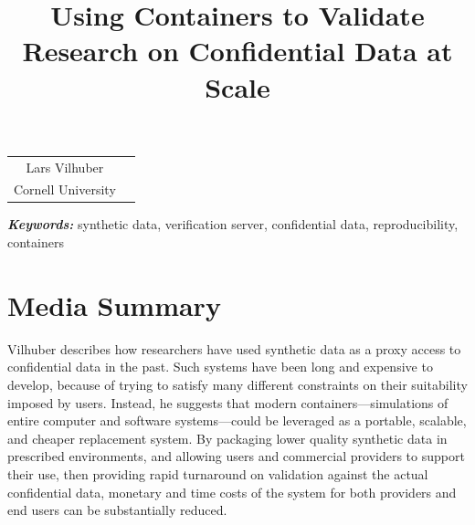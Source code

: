 \documentclass[inline]{hdsr}
\begin{document}




\begin{center}

  \title{Using Containers to Validate Research on Confidential Data at Scale}
  \maketitle

  \thispagestyle{empty}
  
  \vspace*{.2in}

  \begin{tabular}{cc}
    Lars Vilhuber\upstairs{\affilone,*}
   \\[0.25ex]
   {\small \upstairs{\affilone} Cornell University} \\
  \end{tabular}
  
  \vspace*{0.4in}

\begin{abstract}

\end{abstract}
\end{center}

\vspace*{0.15in}
\hspace{10pt}
  \small	
  \textbf{\textit{Keywords: }} {synthetic data, verification server, confidential data, reproducibility, containers}
  
\copyrightnotice

\section*{Media Summary}
Vilhuber describes how researchers have used synthetic data as a proxy access to confidential data in the past. Such systems have been long and expensive to develop, because of trying to satisfy many different constraints on their suitability imposed by users. Instead, he suggests that modern containers---simulations of entire computer and software systems---could be leveraged as a portable, scalable, and cheaper replacement system. By packaging lower quality synthetic data in prescribed environments, and allowing users and commercial providers to support their use, then providing rapid turnaround on validation against the actual confidential data, monetary and time costs of the system for both providers and end users can be substantially reduced. 
\end{document}
